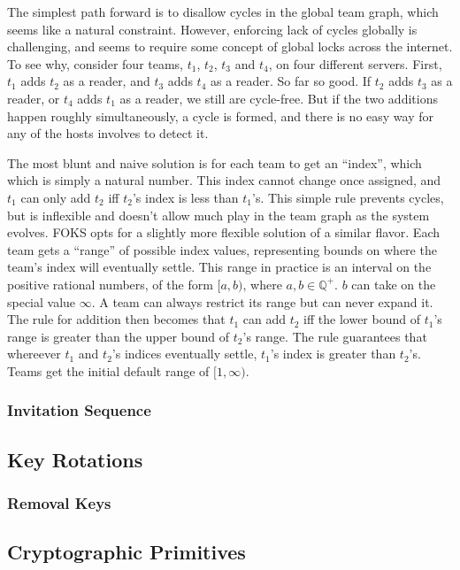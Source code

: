 The simplest path forward is to disallow cycles in the global team
graph, which seems like a natural constraint. However, enforcing
lack of cycles globally is challenging, and seems to require some
concept of global locks across the internet. To see why, consider
four teams, $t_1$, $t_2$, $t_3$ and $t_4$, on four different servers.
First, $t_1$ adds $t_2$ as a reader, and $t_3$ adds $t_4$ as a reader.
So far so good. If $t_2$ adds $t_3$ as a reader, or $t_4$ adds
$t_1$ as a reader, we still are cycle-free.  But if the two additions
happen roughly simultaneously, a cycle is formed, and there is no easy
way for any of the hosts involves to detect it.

The most blunt and naive solution is for each team to get an ``index'', which
which is simply a natural number. This index cannot change once assigned, and
$t_1$ can only add $t_2$ iff $t_2$'s index is less than $t_1$'s. This simple
rule prevents cycles, but is inflexible and doesn't allow much play in the team
graph as the system evolves. FOKS opts for a slightly more flexible solution of
a similar flavor. Each team gets a ``range'' of possible index values,
representing bounds on where the team's index will eventually settle.  This
range in practice is an interval on the positive rational numbers, of the form
$[a,b)$, where $a,b \in \mathbb{Q^{+}}$. $b$ can take on the special value $\infty$.
A team can always restrict its range but can never expand it. The rule for
addition then becomes that $t_1$ can add $t_2$ iff the lower bound of $t_1$'s
range is greater than the upper bound of $t_2$'s range. The rule guarantees that
whereever $t_1$ and $t_2$'s indices eventually settle, $t_1$'s index is greater
than $t_2$'s.  Teams get the initial default range of $[1,\infty)$.


\subsubsection{Invitation Sequence}

\subsection{Key Rotations}
\label{sec:clkr}

\subsubsection{Removal Keys}
\label{sec:removal-keys}

\subsection{Cryptographic Primitives}
\label{sec:cryptography}

